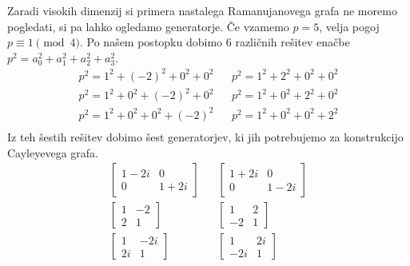 \begin{primer}
    Zaradi visokih dimenzij si primera nastalega Ramanujanovega grafa ne moremo pogledati, si pa lahko ogledamo generatorje. Če vzamemo \(p=5\), velja pogoj \(p \equiv 1 \pmod 4\). Po našem postopku dobimo \(6\) različnih rešitev enačbe \(p^2 = a_0^2 + a_1^2 + a_2^2 + a_3^2\).
    \begin{align*}
        p^2 = 1^2 + (-2)^2 + 0^2 + 0^2 && p^2 = 1^2 + 2^2 + 0^2 + 0^2 \\
        p^2 = 1^2 + 0^2 + (-2)^2 + 0^2 && p^2 = 1^2 + 0^2 + 2^2 + 0^2 \\
        p^2 = 1^2 + 0^2 + 0^2 + (-2)^2 && p^2 = 1^2 + 0^2 + 0^2 + 2^2 \\
    \end{align*}
    Iz teh šestih rešitev dobimo šest generatorjev, ki jih potrebujemo za konstrukcijo Cayleyevega grafa.
    \begin{align*}
        \begin{bmatrix}
            1-2i & 0 \\
            0 & 1+2i
        \end{bmatrix} &&
        \begin{bmatrix}
            1+2i & 0 \\
            0 & 1-2i
        \end{bmatrix} \\
        \begin{bmatrix}
            1 & -2 \\
            2 & 1
        \end{bmatrix} &&
        \begin{bmatrix}
            1 & 2 \\
            -2 & 1
        \end{bmatrix} \\
        \begin{bmatrix}
            1 & -2i \\
            2i & 1
        \end{bmatrix} &&
        \begin{bmatrix}
            1 & 2i \\
            -2i & 1
        \end{bmatrix}
    \end{align*}
\end{primer}

